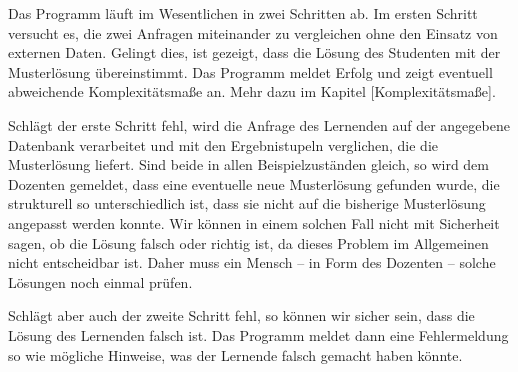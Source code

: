 Das Programm läuft im Wesentlichen in zwei Schritten ab. Im ersten Schritt versucht es, die zwei Anfragen miteinander zu vergleichen ohne den Einsatz von externen Daten. Gelingt dies, ist gezeigt, dass die Lösung des Studenten mit der Musterlösung übereinstimmt. Das Programm meldet Erfolg und zeigt eventuell abweichende Komplexitätsmaße an. Mehr dazu im Kapitel [Komplexitätsmaße].

Schlägt der erste Schritt fehl, wird die Anfrage des Lernenden auf der angegebene Datenbank verarbeitet und mit den Ergebnistupeln verglichen, die die Musterlösung liefert. Sind beide in allen Beispielzuständen gleich, so wird dem Dozenten gemeldet, dass eine eventuelle neue Musterlösung gefunden wurde, die strukturell so unterschiedlich ist, dass sie nicht auf die bisherige Musterlösung angepasst werden konnte. Wir können in einem solchen Fall nicht mit Sicherheit sagen, ob die Lösung falsch oder richtig ist, da dieses Problem im Allgemeinen nicht entscheidbar ist. Daher muss ein Mensch -- in Form des Dozenten -- solche Lösungen noch einmal prüfen.

Schlägt aber auch der zweite Schritt fehl, so können wir sicher sein, dass die Lösung des Lernenden falsch ist. Das Programm meldet dann eine Fehlermeldung so wie mögliche Hinweise, was der Lernende falsch gemacht haben könnte.


